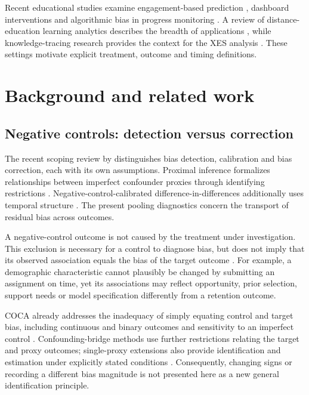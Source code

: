 Recent educational studies examine engagement-based prediction \cite{fazil2024}, dashboard interventions \cite{ramaswami2023} and algorithmic bias in progress monitoring \cite{idowu2024}. A review of distance-education learning analytics describes the breadth of applications \cite{palanci2024}, while knowledge-tracing research provides the context for the XES analysis \cite{abdelrahman2023}. These settings motivate explicit treatment, outcome and timing definitions.

\section{Background and related work}

\subsection{Negative controls: detection versus correction}
The recent scoping review by \cite{yang2024} distinguishes bias detection, calibration and bias correction, each with its own assumptions. Proximal inference formalizes relationships between imperfect confounder proxies through identifying restrictions \cite{proximal2024}. Negative-control-calibrated difference-in-differences additionally uses temporal structure \cite{zhang2025}. The present pooling diagnostics concern the transport of residual bias across outcomes.



A negative-control outcome is not caused by the treatment under investigation. This exclusion is necessary for a control to diagnose bias, but does not imply that its observed association equals the bias of the target outcome \cite{lipsitch2010,coca2014}. For example, a demographic characteristic cannot plausibly be changed by submitting an assignment on time, yet its associations may reflect opportunity, prior selection, support needs or model specification differently from a retention outcome.

COCA already addresses the inadequacy of simply equating control and target bias, including continuous and binary outcomes and sensitivity to an imperfect control \cite{coca2014}. Confounding-bridge methods use further restrictions relating the target and proxy outcomes; single-proxy extensions also provide identification and estimation under explicitly stated conditions \cite{miao2024,park2024}. Consequently, changing signs or recording a different bias magnitude is not presented here as a new general identification principle.

